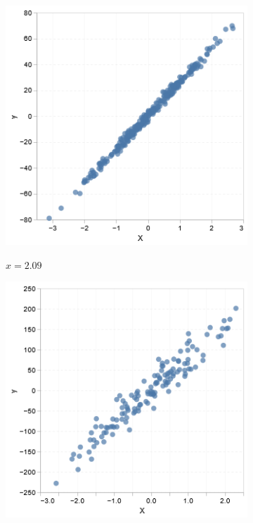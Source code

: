 \begin{figure}
    \centering
    \begin{subfigure}[b]{0.19\textwidth}    
        \centering
        \includegraphics[width=\textwidth]{figures/body/methodology/linear_scatter1.png}
        \label{figure: scatter1}
        \caption{\(x = 2.09\)}
    \end{subfigure}
    \hfill
    \begin{subfigure}[b]{0.19\textwidth}
        \centering
        \includegraphics[width=\textwidth]{figures/body/methodology/linear_scatter2.png}

\end{subfigure}
\end{figure}
